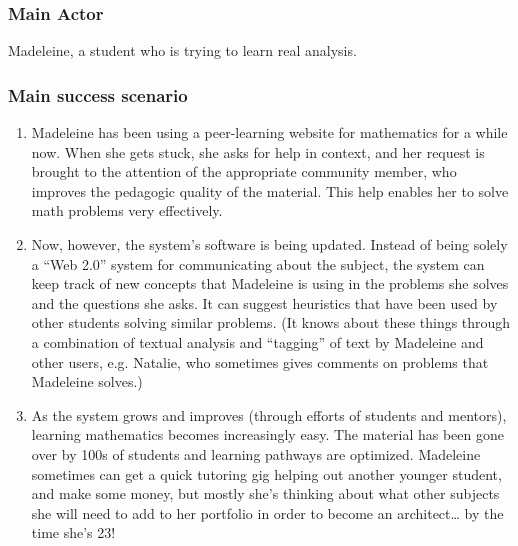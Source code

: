 \subsubsection{Main Actor}

Madeleine, a student who is trying to learn real analysis.

\subsubsection{Main success scenario}

\begin{enumerate}
\item
  Madeleine has been using a peer-learning website for mathematics for a
  while now. When she gets stuck, she asks for help in context, and her
  request is brought to the attention of the appropriate community
  member, who improves the pedagogic quality of the material. This help
  enables her to solve math problems very effectively.
\item
  Now, however, the system's software is being updated. Instead of being
  solely a ``Web 2.0'' system for communicating about the subject, the
  system can keep track of new concepts that Madeleine is using in the
  problems she solves and the questions she asks. It can suggest
  heuristics that have been used by other students solving similar
  problems. (It knows about these things through a combination of
  textual analysis and ``tagging'' of text by Madeleine and other users,
  e.g. Natalie, who sometimes gives comments on problems that Madeleine
  solves.)
\item
  As the system grows and improves (through efforts of students and
  mentors), learning mathematics becomes increasingly easy. The material
  has been gone over by 100s of students and learning pathways are
  optimized. Madeleine sometimes can get a quick tutoring gig helping
  out another younger student, and make some money, but mostly she's
  thinking about what other subjects she will need to add to her
  portfolio in order to become an architect\ldots{} by the time she's
  23!
\end{enumerate}
